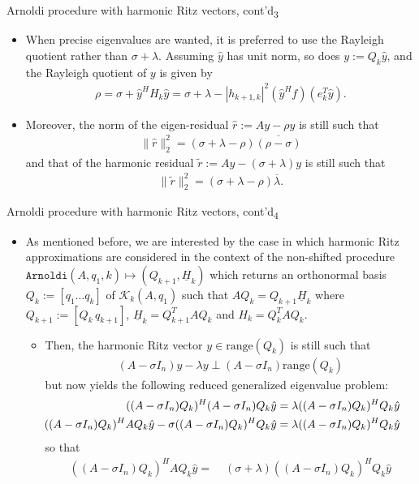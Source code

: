 \documentclass[t,usepdftitle=false]{beamer}
\begin{document}
\begin{frame}{Arnoldi procedure with harmonic Ritz vectors, cont'd\textsubscript{3}}
\begin{itemize}
\item When precise eigenvalues are wanted, it is preferred to use the Rayleigh quotient rather than $\sigma+\lambda$. Assuming $\hat{y}$ has unit norm, so does $y:=Q_k\hat{y}$, and the Rayleigh quotient of $y$ is given by
\begin{align*}
\rho=\sigma+\hat{y}^HH_k\hat{y}=\sigma+\lambda-|h_{k+1,k}|^2(\hat{y}^Hf)(e_k^T\hat{y}).
\end{align*}
\item Moreover, the norm of the eigen-residual $\hat{r}:=Ay-\rho y$ is still such that 
\begin{align*}
\|\hat{r}\|_2^2=(\sigma+\lambda-\rho)\overline{(\rho-\sigma)}
\end{align*}
and that of the harmonic residual $\tilde{r}:=Ay-(\sigma+\lambda)y$ is still such that
\begin{align*}
\|\tilde{r}\|_2^2=(\sigma+\lambda-\rho)\overline{\lambda}.
\end{align*}
\end{itemize}
\end{frame}

\begin{frame}{Arnoldi procedure with harmonic Ritz vectors, cont'd\textsubscript{4}}
\begin{itemize}
\item As mentioned before, we are interested by the case in which harmonic Ritz approximations are considered in the context of the non-shifted procedure $\mathtt{Arnoldi}(A,q_1,k)\mapsto(Q_{k+1},\underline{H}_k)$ which returns an orthonormal basis $Q_k:=[q_1\dots q_k]$ of $\mathcal{K}_k(A,q_1)$ such that $AQ_k=Q_{k+1}\underline{H}_k$ where $Q_{k+1}:=[Q_k\,q_{k+1}]$, $\underline{H}_k=Q_{k+1}^TAQ_k$ and $H_k=Q_k^TAQ_k$.
\begin{itemize}\normalsize
\item Then, the harmonic Ritz vector $y\in\text{range}(Q_k)$ is still such that
\begin{align*}
(A-\sigma I_n)y-\lambda y
\perp
(A-\sigma I_n)\text{range}(Q_k)
\end{align*}
but now yields the following reduced generalized eigenvalue problem:
\begin{align*}
((A-\sigma I_n)Q_k)^H(A-\sigma I_n)Q_k\hat{y}=&\;\lambda((A-\sigma I_n)Q_k)^HQ_k\hat{y}\\
\hspace*{-.5cm}
((A-\sigma I_n)Q_k)^HAQ_k\hat{y}-\sigma((A-\sigma I_n)Q_k)^HQ_k\hat{y}=&\;\lambda((A-\sigma I_n)Q_k)^HQ_k\hat{y}
\end{align*}
so that
\begin{align*}
((A-\sigma I_n)Q_k)^HAQ_k\hat{y}=&\;(\sigma+\lambda)((A-\sigma I_n)Q_k)^HQ_k\hat{y}
\end{align*}
\end{itemize}
\end{itemize}
\end{frame}
\end{document}
